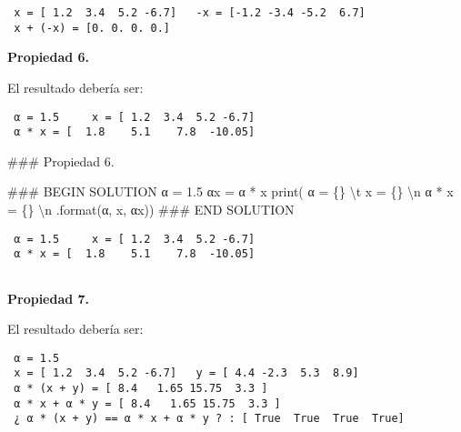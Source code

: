 \documentclass[
  letterpaper,
  DIV=11,
  numbers=noendperiod]{scrreprt}
\newenvironment{Shaded}{\begin{snugshade}}{\end{snugshade}}
\newcommand{\BuiltInTok}[1]{\textcolor[rgb]{0.00,0.23,0.31}{#1}}
\newcommand{\CharTok}[1]{\textcolor[rgb]{0.13,0.47,0.30}{#1}}
\newcommand{\CommentTok}[1]{\textcolor[rgb]{0.37,0.37,0.37}{#1}}
\newcommand{\FloatTok}[1]{\textcolor[rgb]{0.68,0.00,0.00}{#1}}
\newcommand{\NormalTok}[1]{\textcolor[rgb]{0.00,0.23,0.31}{#1}}
\newcommand{\OperatorTok}[1]{\textcolor[rgb]{0.37,0.37,0.37}{#1}}
\newcommand{\RegionMarkerTok}[1]{\textcolor[rgb]{0.00,0.23,0.31}{#1}}
\newcommand{\SpecialCharTok}[1]{\textcolor[rgb]{0.37,0.37,0.37}{#1}}
\newcommand{\StringTok}[1]{\textcolor[rgb]{0.13,0.47,0.30}{#1}}
\begin{document}
\begin{verbatim}
 x = [ 1.2  3.4  5.2 -6.7]   -x = [-1.2 -3.4 -5.2  6.7]
 x + (-x) = [0. 0. 0. 0.]
\end{verbatim}

\textbf{Propiedad 6.}

El resultado debería ser:

\begin{verbatim}
 α = 1.5     x = [ 1.2  3.4  5.2 -6.7] 
 α * x = [  1.8    5.1    7.8  -10.05] 
\end{verbatim}

\begin{Shaded}
\begin{Highlighting}[]
\CommentTok{\#\#\# Propiedad 6.}

\CommentTok{\#\#\# }\RegionMarkerTok{BEGIN}\CommentTok{ SOLUTION}
\NormalTok{α }\OperatorTok{=} \FloatTok{1.5}
\NormalTok{αx }\OperatorTok{=}\NormalTok{ α }\OperatorTok{*}\NormalTok{ x}
\BuiltInTok{print}\NormalTok{(}\StringTok{\textquotesingle{} α = }\SpecialCharTok{\{\}}\StringTok{ }\CharTok{\textbackslash{}t}\StringTok{ x = }\SpecialCharTok{\{\}}\StringTok{ }\CharTok{\textbackslash{}n}\StringTok{ α * x = }\SpecialCharTok{\{\}}\StringTok{  }\CharTok{\textbackslash{}n}\StringTok{ \textquotesingle{}}\NormalTok{.}\BuiltInTok{format}\NormalTok{(α, x, αx))}
\CommentTok{\#\#\# }\RegionMarkerTok{END}\CommentTok{ SOLUTION}
\end{Highlighting}
\end{Shaded}

\begin{verbatim}
 α = 1.5     x = [ 1.2  3.4  5.2 -6.7] 
 α * x = [  1.8    5.1    7.8  -10.05]  
 
\end{verbatim}

\textbf{Propiedad 7.}

El resultado debería ser:

\begin{verbatim}
 α = 1.5
 x = [ 1.2  3.4  5.2 -6.7]   y = [ 4.4 -2.3  5.3  8.9]
 α * (x + y) = [ 8.4   1.65 15.75  3.3 ]
 α * x + α * y = [ 8.4   1.65 15.75  3.3 ]
 ¿ α * (x + y) == α * x + α * y ? : [ True  True  True  True]
\end{verbatim}
\end{document}
